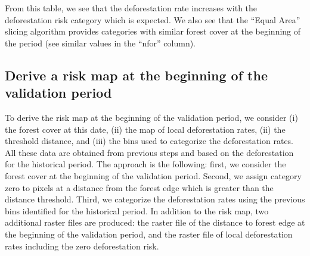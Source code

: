 \documentclass[paper=a4, 12pt, DIV=12]{scrartcl}
\begin{document}
From this table, we see that the deforestation rate increases with the deforestation risk category which is expected. We also see that the ``Equal Area'' slicing algorithm provides categories with similar forest cover at the beginning of the period (see similar values in the ``nfor'' column).

\subsection{Derive a risk map at the beginning of the validation period}
\label{sec:orgf7f1bc7}

To derive the risk map at the beginning of the validation period, we consider (i) the forest cover at this date, (ii) the map of local deforestation rates, (ii) the threshold distance, and (iii) the bins used to categorize the deforestation rates. All these data are obtained from previous steps and based on the deforestation for the historical period. The approach is the following: first, we consider the forest cover at the beginning of the validation period. Second, we assign category zero to pixels at a distance from the forest edge which is greater than the distance threshold. Third, we categorize the deforestation rates using the previous bins identified for the historical period. In addition to the risk map, two additional raster files are produced: the raster file of the distance to forest edge at the beginning of the validation period, and the raster file of local deforestation rates including the zero deforestation risk.
\end{document}
